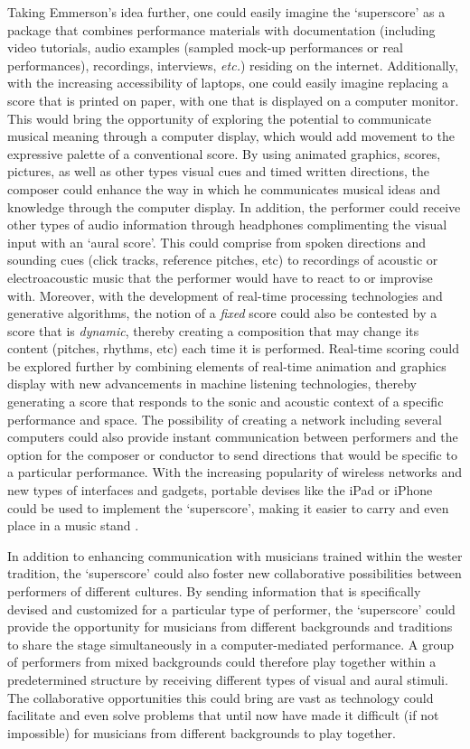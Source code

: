 Taking Emmerson's idea further, one could easily imagine the `superscore' as a package that combines performance materials with documentation (including video tutorials, audio examples (sampled mock-up performances or real performances), recordings, interviews, \emph{etc.}) residing on the internet. Additionally, with the increasing accessibility of laptops, one could easily imagine replacing a score that is printed on paper, with one that is displayed on a computer monitor. This would bring the opportunity of exploring the potential to communicate musical meaning through a computer display, which would add movement to the expressive palette of a conventional score. By using animated graphics, scores, pictures, as well as other types visual cues and timed written directions, the composer could enhance the way in which he communicates musical ideas and knowledge through the computer display. In addition, the performer could receive other types of audio information through headphones complimenting the visual input with an `aural score'. This could comprise from spoken directions and sounding cues (click tracks, reference pitches, etc) to recordings of acoustic or electroacoustic music that the performer would have to react to or improvise with. Moreover, with the development of real-time processing technologies and generative algorithms, the notion of a \emph{fixed} score could also be contested by a score that is \emph{dynamic}, thereby creating a composition that may change its content (pitches, rhythms, etc) each time it is performed. Real-time scoring could be explored further by combining elements of real-time animation and graphics display with new advancements in machine listening technologies, thereby generating a score that responds to the sonic and acoustic context of a specific performance and space. The possibility of creating a network including several computers could also provide instant communication between performers and the option for the composer or conductor to send directions that would be specific to a particular performance. With the increasing popularity of wireless networks and new types of interfaces and gadgets, portable devises like the iPad or iPhone could be used to implement the `superscore', making it easier to carry and even place in a music stand . 

In addition to enhancing communication with musicians trained within the wester tradition, the `superscore' could also foster new collaborative possibilities between performers of different cultures. By sending information that is specifically devised and customized for a particular type of performer, the `superscore' could provide the opportunity for musicians from different backgrounds and traditions to share the stage simultaneously in a computer-mediated performance. A group of performers from mixed backgrounds could therefore play together within a predetermined structure by receiving different types of visual and aural stimuli. The collaborative opportunities this could bring are vast as technology could facilitate and even solve problems that until now have made it difficult (if not impossible) for musicians from different backgrounds to play together.  

